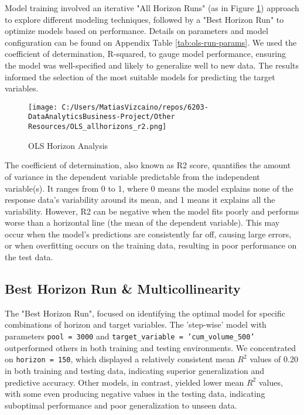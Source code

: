 \documentclass{article}
\begin{document}
Model training involved an iterative "All Horizon Runs" (as in Figure \ref{fig:ols-all-horizons}) approach to explore different modeling techniques, followed by a "Best Horizon Run" to optimize models based on performance. Details on parameters and model configuration can be found on Appendix Table \ref{tab:ols-run-params}. We used the coefficient of determination, R-squared, to gauge model performance, ensuring the model was well-specified and likely to generalize well to new data. The results informed the selection of the most suitable models for predicting the target variables.

\begin{figure}[htbp]
  \centering
  \texttt{[image: C:/Users/MatiasVizcaino/repos/6203-DataAnalyticsBusiness-Project/Other Resources/OLS\_allhorizons\_r2.png]}
  \caption{OLS Horizon Analysis}
  \label{fig:ols-all-horizons}
\end{figure}

The coefficient of determination, also known as R2 score, quantifies the amount of variance in the dependent variable predictable from the independent variable(s). It ranges from 0 to 1, where 0 means the model explains none of the response data's variability around its mean, and 1 means it explains all the variability. However, R2 can be negative when the model fits poorly and performs worse than a horizontal line (the mean of the dependent variable). This may occur when the model's predictions are consistently far off, causing large errors, or when overfitting occurs on the training data, resulting in poor performance on the test data.

\subsection{Best Horizon Run \& Multicollinearity}\label{sec:model-optimization}
The "Best Horizon Run", focused on identifying the optimal model for specific combinations of horizon and target variables. The 'step-wise' model with parameters \texttt{pool = 3000} and \texttt{target\_variable = 'cum\_volume\_500'} outperformed others in both training and testing environments. We concentrated on \texttt{horizon = 150}, which displayed a relatively consistent mean $R^2$ values of 0.20 in both training and testing data, indicating superior generalization and predictive accuracy. Other models, in contrast, yielded lower mean $R^2$ values, with some even producing negative values in the testing data, indicating suboptimal performance and poor generalization to unseen data.
\end{document}

